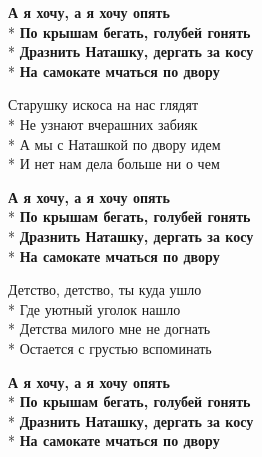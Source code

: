 \medskip

\begin{minipage}{\linewidth}
\textbf{А я хочу, а я хочу опять}\\*
\textbf{По крышам бегать, голубей гонять}\\*
\textbf{Дразнить Наташку, дергать за косу}\\*
\textbf{На самокате мчаться по двору}\\
\end{minipage}\par\medskip\nobreak

\medskip

\begin{minipage}{\linewidth}
Старушку искоса на нас глядят\\*
Не узнают вчерашних забияк\\*
А мы с Наташкой по двору идем\\*
И нет нам дела больше ни о чем\\
\end{minipage}\par\medskip\nobreak

\medskip

\begin{minipage}{\linewidth}
\textbf{А я хочу, а я хочу опять}\\*
\textbf{По крышам бегать, голубей гонять}\\*
\textbf{Дразнить Наташку, дергать за косу}\\*
\textbf{На самокате мчаться по двору}\\
\end{minipage}\par\medskip\nobreak

\medskip

\begin{minipage}{\linewidth}
Детство, детство, ты куда ушло\\*
Где уютный уголок нашло\\*
Детства милого мне не догнать\\*
Остается с грустью вспоминать\\
\end{minipage}\par\medskip\nobreak

\medskip

\begin{minipage}{\linewidth}
\textbf{А я хочу, а я хочу опять}\\*
\textbf{По крышам бегать, голубей гонять}\\*
\textbf{Дразнить Наташку, дергать за косу}\\*
\textbf{На самокате мчаться по двору}\\
\end{minipage}

